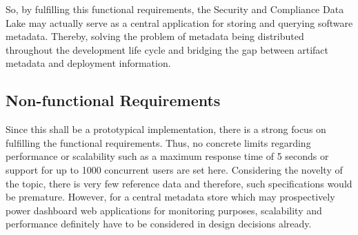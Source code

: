 So, by fulfilling this functional requirements, the Security and Compliance Data Lake may actually serve as a central application for storing and querying software metadata. Thereby, solving the problem of metadata being distributed throughout the development life cycle and bridging the gap between artifact metadata and deployment information.

\subsection{Non-functional Requirements} \label{sec:Non-functional Requirements}
Since this shall be a prototypical implementation, there is a strong focus on fulfilling the functional requirements. Thus, no concrete limits regarding performance or scalability such as a maximum response time of 5 seconds or support for up to 1000 concurrent users are set here. Considering the novelty of the topic, there is very few reference data and therefore, such specifications would be premature. However, for a central metadata store which may prospectively power dashboard web applications for monitoring purposes, scalability and performance definitely have to be considered in design decisions already.

